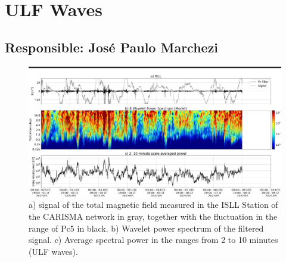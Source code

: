 \documentclass[a4paper, 10pt]{article}
\begin{document}
                     \section{ULF Waves} 
 \subsection{Responsible: José Paulo Marchezi} 
 
\begin{figure}[H]
    
                            \centering
   
                                \includegraphics[width=14cm]{./figures//figureULF_0.png}

                                \caption{a) signal of the total magnetic 
                              field measured in the ISLL Station of the CARISMA 
                              network in gray, together with the fluctuation in the 
                              range of Pc5 in black. b) Wavelet power spectrum of the 
                              filtered signal. c) Average spectral power in the ranges 
                              from 2 to 10 minutes (ULF waves).}
                            \end{figure}
\end{document}
